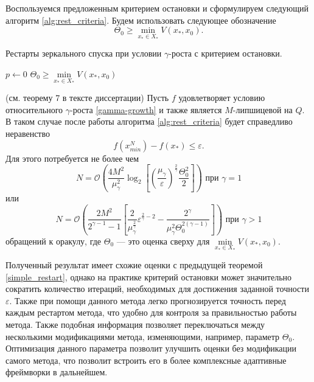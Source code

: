 Воспользуемся предложенным критерием остановки и сформулируем следующий алгоритм \ref{alg:rest_criteria}. Будем использовать следующее обозначение
\[
    \Theta_0 \geq \min\limits_{x_* \in X_*}{V(x_*, x_0)}.
 \]
 \begin{algorithm}[htp]
    \caption{Рестарты зеркального спуска при условии $\gamma$-роста с критерием остановки.}
    \label{alg:rest_criteria}
    $p \gets 0$\;
    $\Theta_0 \geq \min\limits_{x_* \in X_*}{V(x_*,x_0)}$\;
\end{algorithm}
\begin{theorem} (см. теорему 7 в тексте диссертации)
    Пусть $f$ удовлетворяет условию относительного $\gamma$-роста \eqref{gamma-growth} и также является $M$-липшицевой на $Q$. В таком случае после работы алгоритма \ref{alg:rest_criteria} будет справедливо неравенство
    \begin{equation}
        f(x_{min}^N) - f(x_*) \leq \varepsilon.
    \end{equation}
    Для этого потребуется не более чем
    \begin{equation}
       N = \mathcal{O} \left( \frac{4 M^2}{\mu_{\gamma}^2} \log_2{\left[\left(\frac{\mu_{\gamma}}{\varepsilon}\right)^{\frac{2}{\gamma}} \frac{\Theta_0^2}{2}\right]}\right) \text{ при } \gamma = 1
    \end{equation}
    или
    \begin{equation}
       N = \mathcal{O}\left( \frac{2 M^2 }{2^{\gamma - 1} - 1}\left[ \frac{2}{\mu_{\gamma}^{\frac{2}{\gamma}}}\varepsilon^{\frac{2}{\gamma} - 2} - \frac{2^{\gamma}}{\mu_{\gamma}^2 \Theta_0^{2(\gamma - 1)}} \right] \right) \text{ при } \gamma > 1
    \end{equation}
    обращений к оракулу, где $\Theta_0$ --- это оценка сверху для $\min\limits_{x_* \in X_*}{V(x_*, x_0)}$.
\end{theorem}

Полученный результат имеет схожие оценки с предыдущей теоремой \ref{simple_restart}, однако на практике критерий остановки может значительно сократить количество итераций, необходимых для достижения заданной точности $\varepsilon$. Также при помощи данного метода легко прогнозируется точность перед каждым рестартом метода, что удобно для контроля за правильностью работы метода. Также подобная информация позволяет переключаться между несколькими модификациями метода, изменяющими, например, параметр $\Theta_0$. Оптимизация данного параметра позволит улучшить оценки без модификации самого метода, что позволит встроить его в более комплексные адаптивные фреймворки в дальнейшем. 


